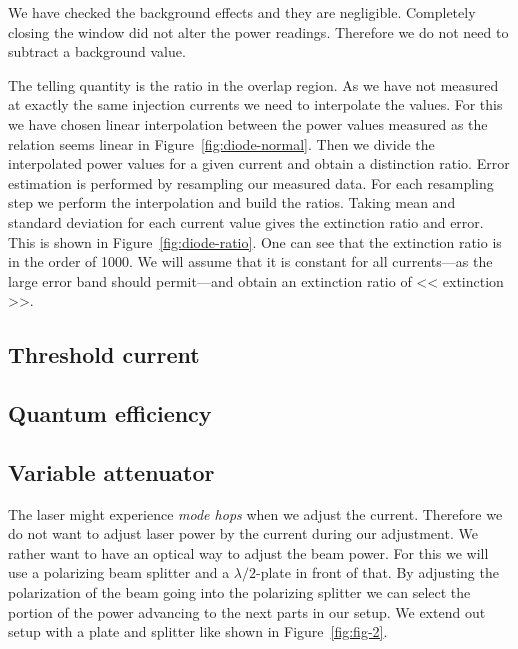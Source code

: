 \documentclass[11pt, english, fleqn, DIV=15, headinclude, BCOR=2cm]{scrreprt}
\begin{document}
We have checked the background effects and they are negligible. Completely
closing the window did not alter the power readings. Therefore we do not need
to subtract a background value.

The telling quantity is the ratio in the overlap region. As we have not
measured at exactly the same injection currents we need to interpolate the
values. For this we have chosen linear interpolation between the power values
measured as the relation seems linear in Figure~\ref{fig:diode-normal}. Then we
divide the interpolated power values for a given current and obtain a
distinction ratio. Error estimation is performed by resampling our measured
data. For each resampling step we perform the interpolation and build the
ratios. Taking mean and standard deviation for each current value gives the
extinction ratio and error.
This is shown in
Figure~\ref{fig:diode-ratio}. One can see that the extinction ratio is in the
order of 1000. We will assume that it is constant for all currents---as the large
error band should permit---and obtain an extinction ratio of \num{<< extinction
>>}.


\subsection{Threshold current}


\subsection{Quantum efficiency}


\subsection{Variable attenuator}
\label{sec:variable_attenuator}

The laser might experience \emph{mode hops} when we adjust the current.
Therefore we do not want to adjust laser power by the current during our
adjustment. We rather want to have an optical way to adjust the beam power. For
this we will use a polarizing beam splitter and a $\lambda/2$-plate in front of
that. By adjusting the polarization of the beam going into the polarizing
splitter we can select the portion of the power advancing to the next parts in
our setup. We extend out setup with a plate and splitter like shown in
Figure~\ref{fig:fig-2}.
\end{document}
